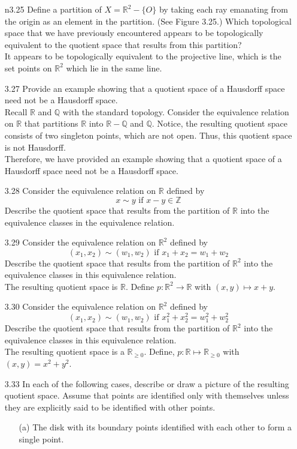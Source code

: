 \documentclass[12pt]{article}
\newcommand{\R}{\mathbb{R}}
\newcommand{\Q}{\mathbb{Q}}
\newcommand{\1}{^{-1}}
\begin{document}
\begin{enumerate}
		
	\item[n3.25] Define a partition of $X=\mathbb{R}^{2}-\{O\}$ by taking each ray emanating from the origin as an element in the partition. (See Figure 3.25.) Which topological space that we have previously encountered appears to be topologically equivalent to the quotient space that results from this partition?\\
	 It appears to be topologically equivalent to the projective line, which is the set points on $ \R^2 $ which lie in the same line.
	\item[3.27] Provide an example showing that a quotient space of a Hausdorff space need not be a Hausdorff space.\\
	Recall $ \R $ and $ \Q $ with the standard topology.  Consider the equivalence relation on $\mathbb{R}$ that partitions $\R$ into $ \R - \Q $ and $ \Q $. Notice, the resulting quotient space consists of two singleton points, which are not open. Thus, this quotient space is not Hausdorff.\\
	Therefore, we have provided an example showing that a quotient space of a Hausdorff space need not be a Hausdorff space.\\
	
	\item[3.28] Consider the equivalence relation on $ \R $ defined by
		\[x \sim y \text{ if } x-y \in \mathbb{Z}\]
	Describe the quotient space that results from the partition of $\mathbb{R}$ into the equivalence classes in the equivalence relation.\\
	
	\item[3.29] Consider the equivalence relation on $\mathbb{R}^{2}$ defined by 
		\[\left(x_{1}, x_{2}\right) \sim\left(w_{1}, w_{2}\right) \text{ if } x_{1}+x_{2}=w_{1}+w_{2}\]
	 Describe the quotient space that results from the partition of $\mathbb{R}^{2}$ into the equivalence classes in this equivalence relation.\\
	The resulting quotient space is $ \R $. Define $ p: \R^2\to\R$ with $ (x,y) \mapsto x+y $.
	\item[3.30] Consider the equivalence relation on $\mathbb{R}^{2}$ defined by
	 	\[\left(x_{1}, x_{2}\right) \sim\left(w_{1}, w_{2}\right) \text{ if } x_{1}^{2}+x_{2}^{2}=w_{1}^{2}+w_{2}^{2}\] 
	 Describe the quotient space that results from the partition of $\mathbb{R}^{2}$ into the equivalence classes in this equivalence relation.\\
	The resulting quotient space is a $ \R_{\geq 0} $. Define, $ p: \R \mapsto \R_{\geq 0} $ with $ (x,y)=x^2+y^2 $.
	\item[3.33] In each of the following cases, describe or draw a picture of the resulting quotient space. Assume that points are identified only with themselves unless they are explicitly said to be identified with other points.
	\begin{enumerate}
		\item[(a)]The disk with its boundary points identified with each other to form a single point.\\
		

\end{enumerate}
\end{enumerate}
\end{document}
